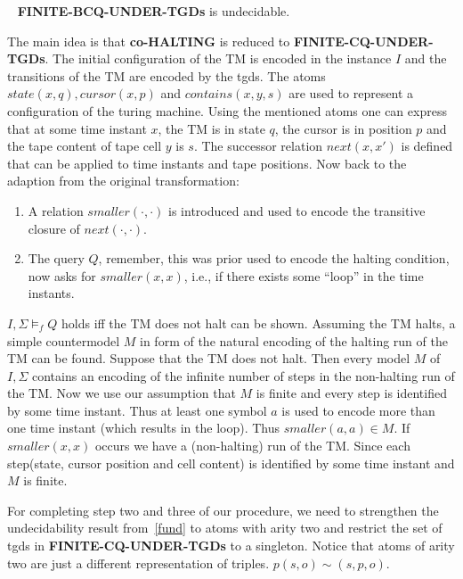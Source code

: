 \begin{theorem}\label{fund}~\cite{pichler2014containment}
	\textbf{FINITE-BCQ-UNDER-TGDs} is undecidable.
\end{theorem}
\begin{proofidea}
	The main idea is that \textbf{co-HALTING} is reduced to
	\textbf{FINITE-CQ-UNDER-TGDs}. 
	The initial configuration of the TM is encoded in the instance $I$ and the
	transitions of the TM are encoded by the tgds. 
	The atoms $state(x,q), cursor(x,p)$ and $contains(x,y,s)$ are used to
	represent a configuration of the turing machine. Using the mentioned atoms one can
	express that at some time instant $x$, the TM is in state $q$, the cursor is
	in position $p$ and the tape content of tape cell $y$ is $s$.
	The successor relation $next(x,x')$ is defined that can be applied to time
	instants and tape positions.
	Now back to the adaption from the original transformation:
	\begin{enumerate}
		\item A relation $smaller(\cdot,\cdot)$ is introduced and
		used to encode the transitive closure of $next(\cdot,\cdot)$.
	\item The query $Q$, remember, this was prior used to encode the halting
			condition, now asks for $smaller(x,x)$, i.e., if there exists some
		``loop'' in the time instants.  
	\end{enumerate}
	$I,\Sigma \models_f Q$ holds iff the TM does not halt can be shown.
	Assuming the TM halts, a simple countermodel $M$ in form of the natural encoding
	of the halting run of the TM can be found.
	Suppose that the TM does not halt. Then every model $M$ of $I,\Sigma$
	contains an encoding of the infinite number of steps in the non-halting run
	of the TM. Now we use our assumption that $M$ is finite and every step is
	identified by some time instant. Thus at least one symbol $a$ is used to
	encode more than one time instant (which results in the loop). Thus
	$smaller(a,a) \in M$. If $smaller(x,x)$ occurs we have a (non-halting) run of the TM. 
	Since each step(state, cursor position and cell content) is identified by
	some time instant and $M$ is finite. 
\end{proofidea}

For completing step two and three of our procedure, we need to strengthen the
undecidability result from~\ref{fund} to atoms with arity two and restrict
the set of tgds in \textbf{FINITE-CQ-UNDER-TGDs} to a singleton. 
Notice that atoms of arity two are just a different representation of triples. 
$p(s,o) \sim (s,p,o)$.

